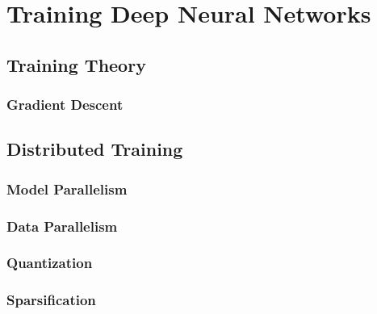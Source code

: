 \thispagestyle{myheadings}

\graphicspath{{2_Body/Figures/}}

\section{Training Deep Neural Networks}
\subsection{Training Theory}
\subsubsection{Gradient Descent}

\subsection{Distributed Training}
%
\cite{dean2012large}
\subsubsection{Model Parallelism}
\subsubsection{Data Parallelism}
\subsubsection{Quantization}
\subsubsection{Sparsification}
\cite{lin2017deep}